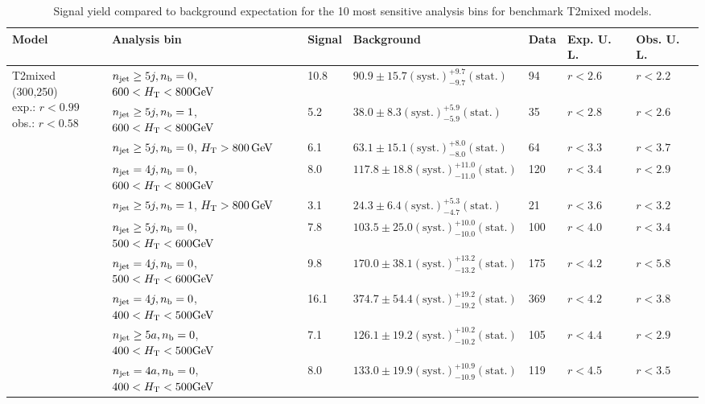 \begin{table}[h!] 
  \scriptsize
  \caption{ 
Signal yield compared to background expectation for the 10 most sensitive analysis bins 
for benchmark T2mixed models.
  \label{tab:sigBenchmarksYields_T2mixed}}
  \centering 
  \begin{tabular}{ lllllll } 
    \hline 
    \hline 
    Model & Analysis bin & Signal & Background & Data & Exp. U. L. & Obs. U. L. \\ \hline
\multirow{10}{*}{\parbox[t]{2cm}{T2mixed (300,250)\\exp.: $r<0.99$\\obs.: $r<0.58$}}
 & $n_{\mathrm{jet}} \geq5j,n_{\text{b}} =0$, $600 < \mbox{$H_\text{T}$} < 800 \mathrm{GeV}$ & 10.8 & $90.9 \pm 15.7 \mathrm{(syst.)} ^{+9.7}_{-9.7} \mathrm{(stat.)}$ & 94 & $r < 2.6$ & $r < 2.2$\\ 
 & $n_{\mathrm{jet}} \geq5j,n_{\text{b}} =1$, $600 < \mbox{$H_\text{T}$} < 800 \mathrm{GeV}$ & 5.2 & $38.0 \pm 8.3 \mathrm{(syst.)} ^{+5.9}_{-5.9} \mathrm{(stat.)}$ & 35 & $r < 2.8$ & $r < 2.6$\\ 
 & $n_{\mathrm{jet}} \geq5j,n_{\text{b}} =0$, $\mbox{$H_\text{T}$} > 800 \, \mathrm{GeV}$ & 6.1 & $63.1 \pm 15.1 \mathrm{(syst.)} ^{+8.0}_{-8.0} \mathrm{(stat.)}$ & 64 & $r < 3.3$ & $r < 3.7$\\ 
 & $n_{\mathrm{jet}} =4j,n_{\text{b}} =0$, $600 < \mbox{$H_\text{T}$} < 800 \mathrm{GeV}$ & 8.0 & $117.8 \pm 18.8 \mathrm{(syst.)} ^{+11.0}_{-11.0} \mathrm{(stat.)}$ & 120 & $r < 3.4$ & $r < 2.9$\\ 
 & $n_{\mathrm{jet}} \geq5j,n_{\text{b}} =1$, $\mbox{$H_\text{T}$} > 800 \, \mathrm{GeV}$ & 3.1 & $24.3 \pm 6.4 \mathrm{(syst.)} ^{+5.3}_{-4.7} \mathrm{(stat.)}$ & 21 & $r < 3.6$ & $r < 3.2$\\ 
 & $n_{\mathrm{jet}} \geq5j,n_{\text{b}} =0$, $500 < \mbox{$H_\text{T}$} < 600 \mathrm{GeV}$ & 7.8 & $103.5 \pm 25.0 \mathrm{(syst.)} ^{+10.0}_{-10.0} \mathrm{(stat.)}$ & 100 & $r < 4.0$ & $r < 3.4$\\ 
 & $n_{\mathrm{jet}} =4j,n_{\text{b}} =0$, $500 < \mbox{$H_\text{T}$} < 600 \mathrm{GeV}$ & 9.8 & $170.0 \pm 38.1 \mathrm{(syst.)} ^{+13.2}_{-13.2} \mathrm{(stat.)}$ & 175 & $r < 4.2$ & $r < 5.8$\\ 
 & $n_{\mathrm{jet}} =4j,n_{\text{b}} =0$, $400 < \mbox{$H_\text{T}$} < 500 \mathrm{GeV}$ & 16.1 & $374.7 \pm 54.4 \mathrm{(syst.)} ^{+19.2}_{-19.2} \mathrm{(stat.)}$ & 369 & $r < 4.2$ & $r < 3.8$\\ 
 & $n_{\mathrm{jet}} \geq5a,n_{\text{b}} =0$, $400 < \mbox{$H_\text{T}$} < 500 \mathrm{GeV}$ & 7.1 & $126.1 \pm 19.2 \mathrm{(syst.)} ^{+10.2}_{-10.2} \mathrm{(stat.)}$ & 105 & $r < 4.4$ & $r < 2.9$\\ 
 & $n_{\mathrm{jet}} =4a,n_{\text{b}} =0$, $400 < \mbox{$H_\text{T}$} < 500 \mathrm{GeV}$ & 8.0 & $133.0 \pm 19.9 \mathrm{(syst.)} ^{+10.9}_{-10.9} \mathrm{(stat.)}$ & 119 & $r < 4.5$ & $r < 3.5$\\ \hline
    \hline
  \end{tabular}
\end{table}

